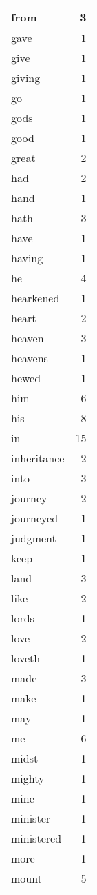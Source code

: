 \begin{center}
\begin{longtable}{l|r}
from & 3 \\ \hline
gave & 1 \\ \hline
give & 1 \\ \hline
giving & 1 \\ \hline
go & 1 \\ \hline
gods & 1 \\ \hline
good & 1 \\ \hline
great & 2 \\ \hline
had & 2 \\ \hline
hand & 1 \\ \hline
hath & 3 \\ \hline
have & 1 \\ \hline
having & 1 \\ \hline
he & 4 \\ \hline
hearkened & 1 \\ \hline
heart & 2 \\ \hline
heaven & 3 \\ \hline
heavens & 1 \\ \hline
hewed & 1 \\ \hline
him & 6 \\ \hline
his & 8 \\ \hline
in & 15 \\ \hline
inheritance & 2 \\ \hline
into & 3 \\ \hline
journey & 2 \\ \hline
journeyed & 1 \\ \hline
judgment & 1 \\ \hline
keep & 1 \\ \hline
land & 3 \\ \hline
like & 2 \\ \hline
lords & 1 \\ \hline
love & 2 \\ \hline
loveth & 1 \\ \hline
made & 3 \\ \hline
make & 1 \\ \hline
may & 1 \\ \hline
me & 6 \\ \hline
midst & 1 \\ \hline
mighty & 1 \\ \hline
mine & 1 \\ \hline
minister & 1 \\ \hline
ministered & 1 \\ \hline
more & 1 \\ \hline
mount & 5 \\ \hline

\end{longtable}
\end{center}
